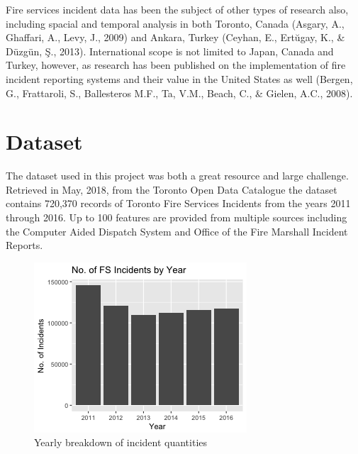 \documentclass[12pt,letterpaper, oneside]
{article}
\begin{document}
Fire services incident data has been the subject of other types of research also, including spacial and temporal analysis in both Toronto, Canada (Asgary, A., Ghaffari, A., Levy, J., 2009) and Ankara, Turkey (Ceyhan, E., Ertŭgay, K., \& Düzgün, Ş., 2013). International scope is not limited to Japan, Canada and Turkey, however, as research has been published on the implementation of fire incident reporting systems and their value in the United States as well (Bergen, G., Frattaroli, S., Ballesteros M.F., Ta, V.M., Beach, C., \& Gielen, A.C., 2008).

\section{Dataset}

The dataset used in this project was both a great resource and large challenge. Retrieved in May, 2018, from the Toronto Open Data Catalogue the dataset contains 720,370 records of Toronto Fire Services Incidents from the years 2011 through 2016. Up to 100 features are provided from multiple sources including the Computer Aided Dispatch System and Office of the Fire Marshall Incident Reports. 

\begin{figure}
	\centering
	\includegraphics[width=\textwidth]{Incidents_by_year}
	\caption{Yearly breakdown of incident quantities
		\label{fig:yearly}
	}
	
\end{figure} 
\end{document}
